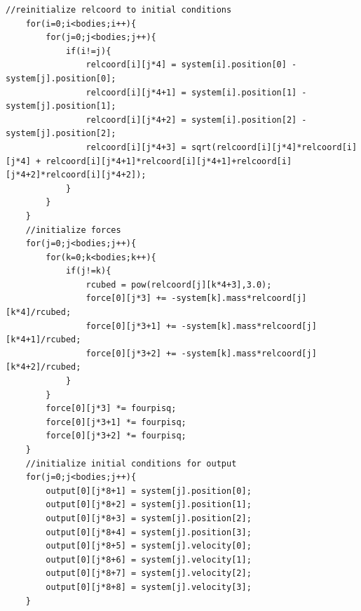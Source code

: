 \documentclass[11pt,a4paper]{article}
\begin{document}
\begin{lstlisting}[title={project3-library.h}]
	//reinitialize relcoord to initial conditions
	for(i=0;i<bodies;i++){
		for(j=0;j<bodies;j++){
			if(i!=j){
				relcoord[i][j*4] = system[i].position[0] - system[j].position[0];
				relcoord[i][j*4+1] = system[i].position[1] - system[j].position[1];
				relcoord[i][j*4+2] = system[i].position[2] - system[j].position[2];
				relcoord[i][j*4+3] = sqrt(relcoord[i][j*4]*relcoord[i][j*4] + relcoord[i][j*4+1]*relcoord[i][j*4+1]+relcoord[i][j*4+2]*relcoord[i][j*4+2]);
			}
		}
	}
	//initialize forces
	for(j=0;j<bodies;j++){
		for(k=0;k<bodies;k++){
			if(j!=k){
				rcubed = pow(relcoord[j][k*4+3],3.0);
				force[0][j*3] += -system[k].mass*relcoord[j][k*4]/rcubed;
				force[0][j*3+1] += -system[k].mass*relcoord[j][k*4+1]/rcubed;
				force[0][j*3+2] += -system[k].mass*relcoord[j][k*4+2]/rcubed;
			}
		}
		force[0][j*3] *= fourpisq;
		force[0][j*3+1] *= fourpisq;
		force[0][j*3+2] *= fourpisq;
	}
	//initialize initial conditions for output
	for(j=0;j<bodies;j++){
		output[0][j*8+1] = system[j].position[0];
		output[0][j*8+2] = system[j].position[1];
		output[0][j*8+3] = system[j].position[2];
		output[0][j*8+4] = system[j].position[3];
		output[0][j*8+5] = system[j].velocity[0];
		output[0][j*8+6] = system[j].velocity[1];
		output[0][j*8+7] = system[j].velocity[2];
		output[0][j*8+8] = system[j].velocity[3];
	}


\end{lstlisting}
\end{document}
